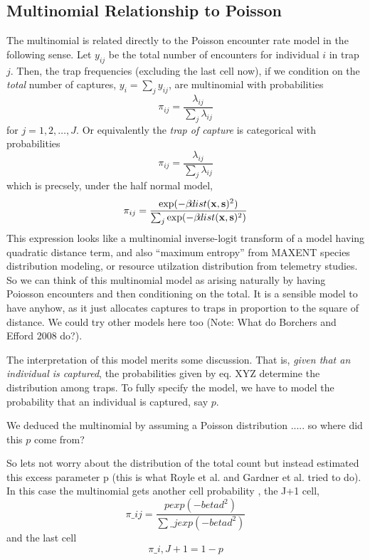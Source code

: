 {\subsection{Multinomial Relationship to Poisson}

The multinomial is related directly to the Poisson encounter rate
model in the following sense. Let $y_{ij}$ be the total number of
encounters for individual $i$ in trap $j$. Then, the trap frequencies
(excluding the last cell now), if we condition on the {\it total}
number of captures, $y_{i} = \sum_{j} y_{ij}$, are multinomial with
probabilities
\[
 \pi_{ij} =  \frac{ \lambda_{ij} } { \sum_{j} \lambda_{ij} } 
\]
for $j=1,2,\ldots,J$.
Or equivalently the {\it trap of
  capture} is categorical with probabilities
\[
 \pi_{ij} =  \frac{ \lambda_{ij} } { \sum_{j} \lambda_{ij} } 
\]
which is precsely, under the half normal model, 
\[
 \pi_{ij} =  \frac{ \exp( - \beta \! dist({\bf x},{\bf s})^2 ) }  {
   \sum_{j} \exp(-\beta \! dist({\bf x},{\bf s})^2)}
\]
This expression looks like a multinomial inverse-logit transform of a model having
quadratic distance term, and also ``maximum entropy'' from MAXENT
species distribution modeling, or resource utilzation distribution
from telemetry studies.
So we can think of this multinomial model as arising naturally 
by having Poiosson encounters and then conditioning on the total. 
It is a sensible model to have anyhow, as it just allocates captures
to traps in proportion to the square of distance.  We could try other
models here too (Note: What do Borchers and Efford 2008 do?).


The interpretation of this model merits some discussion. That is, 
{\it given that an individual is captured}, the probabilities given by
eq. XYZ determine 
the distribution among traps. To fully specify the model, we have to
model the probability that an individual is captured, say $p$.

We deduced the multinomial by assuming a Poisson distribution
..... so
where did this $p$ come from?

So lets not worry about the distribution of the total count
but instead estimated this excess parameter p (this is what Royle et al.
and Gardner et al. tried to do).  In this case the multinomial gets
another cell probability , the J+1 cell, 
\[
 \pi\_{ij} =  \frac{ p exp( - beta d^2 ) }  { \sum\_{j} exp(-beta d^2)}
\]
and the last cell
\[
 \pi\_{i,J+1} =  1-p 
\]

}
